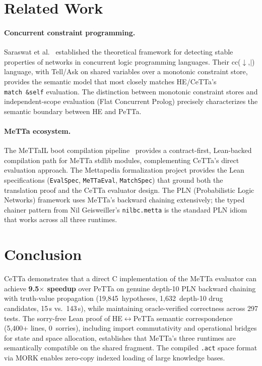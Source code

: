 \documentclass[11pt]{article}
\newcommand{\code}[1]{\texttt{#1}}
\newcommand{\PeTTa}{\textup{PeTTa}}
\newcommand{\HE}{\textup{HE}}
\newcommand{\CeTTa}{\textup{CeTTa}}
\begin{document}
\section{Related Work}

\paragraph{Concurrent constraint programming.}
Saraswat et al.~\cite{saraswat1988} established the theoretical
framework for detecting stable properties of networks in concurrent
logic programming languages.  Their cc($\downarrow$,$|$) language,
with Tell/Ask on shared variables over a monotonic constraint store,
provides the semantic model that most closely matches \HE{}/\CeTTa{}'s
\code{match~\&self} evaluation.  The distinction between monotonic
constraint stores and independent-scope evaluation (Flat Concurrent
Prolog) precisely characterizes the semantic boundary between \HE{} and
\PeTTa{}.

\paragraph{MeTTa ecosystem.}
The MeTTaIL boot compilation pipeline~\cite{mettail} provides a
contract-first, Lean-backed compilation path for MeTTa stdlib modules,
complementing \CeTTa{}'s direct evaluation approach.  The Mettapedia
formalization project provides the Lean specifications (\code{EvalSpec},
\code{MeTTaEval}, \code{MatchSpec}) that ground both the translation
proof and the \CeTTa{} evaluator design.  The PLN (Probabilistic Logic
Networks) framework uses MeTTa's backward chaining extensively; the
typed chainer pattern from Nil Geisweiller's \code{nilbc.metta} is
the standard PLN idiom that works across all three runtimes.

\section{Conclusion}

\CeTTa{} demonstrates that a direct C implementation of the MeTTa
evaluator can achieve \textbf{9.5$\times$ speedup} over \PeTTa{} on
genuine depth-10 PLN backward chaining with truth-value propagation
(19{,}845~hypotheses, 1{,}632~depth-10 drug candidates, 15\,s vs.\
143\,s), while maintaining oracle-verified correctness across 297 tests.
The sorry-free Lean proof of \HE{}$\leftrightarrow$\PeTTa{} semantic
correspondence (5{,}400+ lines, 0~sorries), including import
commutativity and operational bridges for state and space allocation,
establishes that MeTTa's three runtimes are semantically compatible
on the shared fragment.  The compiled \code{.act} space format via
MORK enables zero-copy indexed loading of large knowledge bases.
\end{document}
